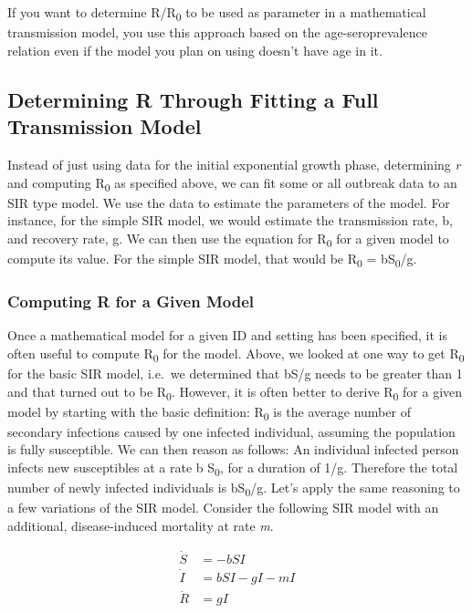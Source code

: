 \documentclass[]{book}
\theoremstyle{definition}
\theoremstyle{definition}
\theoremstyle{definition}
\theoremstyle{remark}
\begin{document}
If you want to determine R/R\textsubscript{0} to be used as parameter in
a mathematical transmission model, you use this approach based on the
age-seroprevalence relation even if the model you plan on using doesn't
have age in it.

\subsection{Determining R Through Fitting a Full Transmission
Model}\label{determining-r-through-fitting-a-full-transmission-model}

Instead of just using data for the initial exponential growth phase,
determining \emph{r} and computing R\textsubscript{0} as specified
above, we can fit some or all outbreak data to an SIR type model. We use
the data to estimate the parameters of the model. For instance, for the
simple SIR model, we would estimate the transmission rate, b, and
recovery rate, g. We can then use the equation for R\textsubscript{0}
for a given model to compute its value. For the simple SIR model, that
would be R\textsubscript{0} = bS\textsubscript{0}/g.

\subsubsection{Computing R for a Given Model}\label{myadvancedbox}

Once a mathematical model for a given ID and setting has been specified,
it is often useful to compute R\textsubscript{0} for the model. Above,
we looked at one way to get R\textsubscript{0} for the basic SIR model,
i.e.~we determined that bS/g needs to be greater than 1 and that turned
out to be R\textsubscript{0}. However, it is often better to derive
R\textsubscript{0} for a given model by starting with the basic
definition: R\textsubscript{0} is the average number of secondary
infections caused by one infected individual, assuming the population is
fully susceptible. We can then reason as follows: An individual infected
person infects new susceptibles at a rate b S\textsubscript{0}, for a
duration of 1/g. Therefore the total number of newly infected
individuals is bS\textsubscript{0}/g. Let's apply the same reasoning to
a few variations of the SIR model. Consider the following SIR model with
an additional, disease-induced mortality at rate \emph{m}.

\[ 
\begin{aligned}
\dot S &= -b SI \\
\dot I &= b S I - g I - m I\\
\dot R &= g I
\end{aligned}
\]
\end{document}
